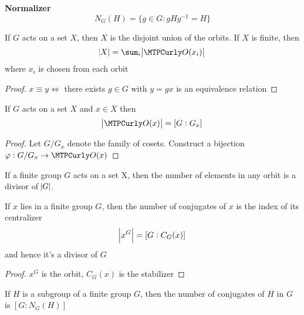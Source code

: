 \documentclass[11pt]{article}
\begin{document}
\textbf{Normalizer}
\begin{equation*}
N_G(H)=\{g\in G:gHg^{-1}=H\}
\end{equation*}


\begin{proposition}[]
If \(G\) acts on a set \(X\), then \(X\) is the disjoint union of the orbits. If
\(X\) is finite, then
\begin{equation*}
\abs{X}=\displaystyle\sum_i\abs{\calo(x_i)}
\end{equation*}
where \(x_i\) is chosen from each orbit
\end{proposition}

\begin{proof}
\(x\equiv y\Leftrightarrow\) there exists \(g\in G\) with \(y=gx\) is an
equivalence relation
\end{proof}


\begin{theorem}[]
\label{thm2.98}
If \(G\) acts on a set \(X\) and \(x\in X\) then
\begin{equation*}
\abs{\calo(x)}=[G:G_x]
\end{equation*}
\end{theorem}

\begin{proof}
Let \(G/G_x\) denote the family of cosets. Construct a bijection
\(\varphi:G/G_x\to \calo(x)\)
\end{proof}

\begin{corollary}[]
\label{cor2.99}
   If a finite group \(G\) acts on a set X, then the number of elements in any
   orbit is a divisor of \(\abs{G}\). 
\end{corollary}

\begin{corollary}[]
\label{cor2.100}
If \(x\) lies in a finite group \(G\), then the number of conjugates of \(x\) is
the index of its centralizer
\begin{equation*}
\abs{x^G}=[G:C_G(x)]
\end{equation*}
and hence it's a divisor of \(G\)
\end{corollary}

\begin{proof}
\(x^G\) is the orbit, \(C_G(x)\) is the stabilizer
\end{proof}

\begin{proposition}[]
If \(H\) is a subgroup of a finite group \(G\), then the number of conjugates of
\(H\) in \(G\) is \([G:N_G(H)]\)
\end{proposition}
\end{document}
